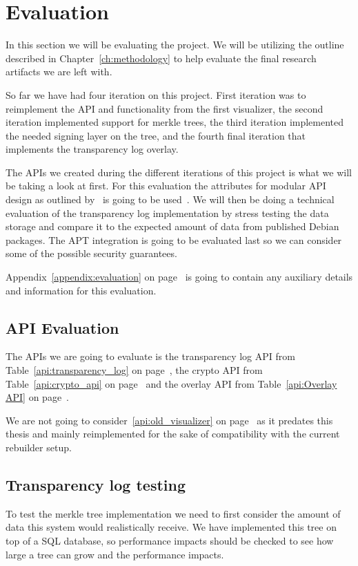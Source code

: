 \documentclass[../Main/thesis.tex]{subfiles}
\begin{document}
\chapter{Evaluation}%
\label{ch:evaluation}
In this section we will be evaluating the project. We will be utilizing the
outline described in Chapter~\ref{ch:methodology} to help evaluate the final
research artifacts we are left with.

So far we have had four iteration on this project. First iteration was to
reimplement the API and functionality from the first visualizer, the second
iteration implemented support for merkle trees, the third iteration implemented
the needed signing layer on the tree, and the fourth final iteration that
implements the transparency log overlay.

The APIs we created during the different iterations of this project is what we
will be taking a look at first. For this evaluation the attributes for modular
API design as outlined by~\citeauthor{Iyer:2012:EAC:2342209.2342213} is going to
be used~\cite{Iyer:2012:EAC:2342209.2342213}. We will then be doing a technical
evaluation of the transparency log implementation by stress testing the data
storage and compare it to the expected amount of data from published Debian
packages. The APT integration is going to be evaluated last so we can consider
some of the possible security guarantees.

Appendix~\ref{appendix:evaluation} on page~\pageref{appendix:evaluation} is
going to contain any auxiliary details  and information for this evaluation.


\section{API Evaluation}%
\label{sec:api_evaluation}
The APIs we are going to evaluate is the transparency log
API from Table~\ref{api:transparency_log} on page~\pageref{api:transparency_log}, the
crypto API from Table~\ref{api:crypto_api} on page~\pageref{api:crypto_api} and the overlay
API from Table~\ref{api:Overlay API} on page~\pageref{api:Overlay API}.

We are not going to consider~\ref{api:old_visualizer} on
page~\pageref{api:old_visualizer} as it predates this thesis and mainly
reimplemented for the sake of compatibility with the current rebuilder setup.

\section{Transparency log testing}%
\label{sec:transparency_log_testing}
To test the merkle tree implementation we need to first consider the amount of
data this system would realistically receive. We have implemented this tree on
top of a SQL database, so performance impacts should be checked to see how large
a tree can grow and the performance impacts.
\end{document}

